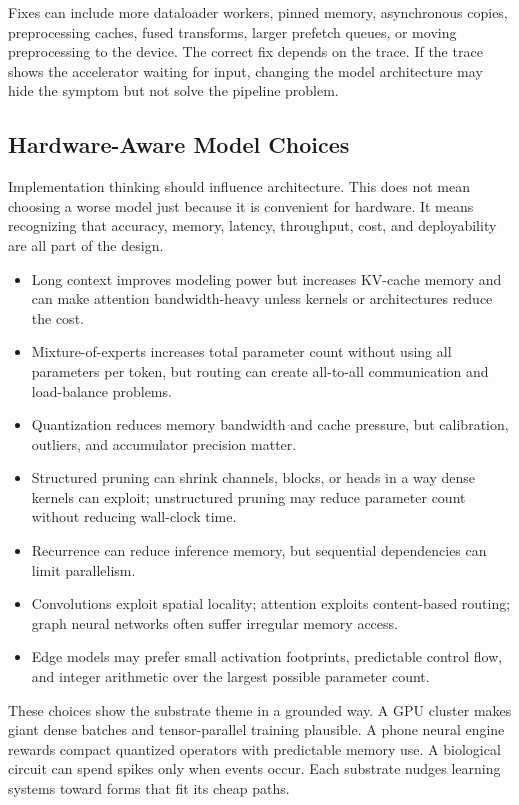 Fixes can include more dataloader workers, pinned memory, asynchronous copies, preprocessing caches, fused transforms, larger prefetch queues, or moving preprocessing to the device. The correct fix depends on the trace. If the trace shows the accelerator waiting for input, changing the model architecture may hide the symptom but not solve the pipeline problem.

\subsection{Hardware-Aware Model Choices}

Implementation thinking should influence architecture. This does not mean choosing a worse model just because it is convenient for hardware. It means recognizing that accuracy, memory, latency, throughput, cost, and deployability are all part of the design.

\begin{itemize}[leftmargin=*]
  \item Long context improves modeling power but increases KV-cache memory and can make attention bandwidth-heavy unless kernels or architectures reduce the cost.
  \item Mixture-of-experts increases total parameter count without using all parameters per token, but routing can create all-to-all communication and load-balance problems.
  \item Quantization reduces memory bandwidth and cache pressure, but calibration, outliers, and accumulator precision matter.
  \item Structured pruning can shrink channels, blocks, or heads in a way dense kernels can exploit; unstructured pruning may reduce parameter count without reducing wall-clock time.
  \item Recurrence can reduce inference memory, but sequential dependencies can limit parallelism.
  \item Convolutions exploit spatial locality; attention exploits content-based routing; graph neural networks often suffer irregular memory access.
  \item Edge models may prefer small activation footprints, predictable control flow, and integer arithmetic over the largest possible parameter count.
\end{itemize}

These choices show the substrate theme in a grounded way. A GPU cluster makes giant dense batches and tensor-parallel training plausible. A phone neural engine rewards compact quantized operators with predictable memory use. A biological circuit can spend spikes only when events occur. Each substrate nudges learning systems toward forms that fit its cheap paths.

